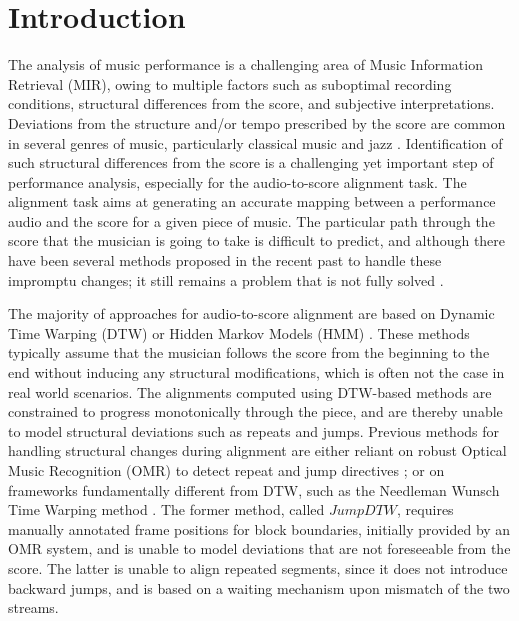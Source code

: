 \documentclass{article}
\begin{document}
\section{Introduction}
\vspace{-0.2cm}
The analysis of %
music performance is a challenging area of Music Information Retrieval (MIR), owing to multiple factors such as suboptimal recording conditions, structural differences from the score, and subjective interpretations. 
Deviations from the structure and/or tempo prescribed by the score are %
common in several genres of music, particularly classical music and jazz \cite{widmer2016getting}.
Identification of such structural differences from the score is a challenging yet important step of performance analysis, especially for the audio-to-score alignment task. 
The alignment task aims at generating an accurate mapping between a performance audio and the score for a given piece of music.
The particular path through the score that the musician is going to take is difficult to predict, and although there have been several methods proposed in the recent past to handle these impromptu changes;  it still remains a problem that is not fully solved \cite{arzt2016flexible}.
\vspace{0.1cm}
 \par The majority of approaches for audio-to-score alignment are based on Dynamic Time Warping (DTW) \cite{dixon2005line} or Hidden Markov Models (HMM) \cite{muller2015fundamentals}. These methods typically assume that the musician follows the score from the beginning to the end without inducing any structural modifications, which is often not the case in real world scenarios. The alignments computed using DTW-based methods are constrained to progress monotonically through the piece, and are thereby unable to model structural deviations such as repeats and jumps. Previous methods for handling structural changes during alignment are either reliant on robust Optical Music Recognition (OMR) to detect repeat and jump directives \cite{Fremerey2010handling}; or on frameworks fundamentally different from DTW, such as the Needleman Wunsch Time Warping method \cite{grachten2013automatic}. The former method, called \begin{math}\textit{JumpDTW}\end{math}, requires manually annotated frame positions for block boundaries, initially provided by an OMR system, and is unable to model deviations that are not foreseeable from the score. The latter is unable to align repeated segments, since it does not introduce backward jumps, and is based on a waiting mechanism upon mismatch of the two streams. 
\end{document}
